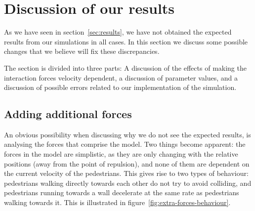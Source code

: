 \section{Discussion of our results}
\label{sec:discussion}
As we have seen in section~\ref{sec:results}, we have not obtained the 
expected results from our simulations in all cases. In this section we discuss 
some possible changes that we believe will fix these discrepancies.

The section is divided into three parts: A discussion of the effects of making 
the interaction forces velocity dependent, a discussion of parameter values, and a 
discussion of possible errors related to our implementation of the simulation.

\subsection{Adding additional forces}
An obvious possibility when discussing why we do not see the expected results, 
is analysing the forces that comprise the model. Two things become apparent: 
the forces in the model are simplistic, as they are only changing with the relative 
positions (away from the point of repulsion), and none of them are dependent 
on the current velocity of the pedestrians. This gives rise to two types of 
behaviour: pedestrians walking directly towards each other do not try to avoid 
colliding, and pedestrians running towards a wall decelerate at the same rate 
as pedestrians walking towards it. This is illustrated in 
figure~\ref{fig:extra-forces-behaviour}.

